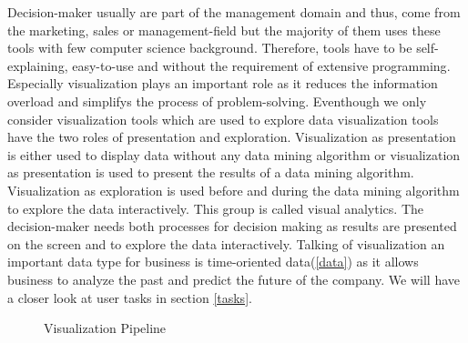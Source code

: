 Decision-maker usually are part of the management domain and thus, come from the marketing, sales or management-field but the majority of them uses these tools with few computer science background. Therefore, tools have to be self-explaining, easy-to-use \cite{Crapo2000} and without the requirement of extensive programming\label{user}. Especially visualization plays an important role as it reduces the information overload\cite{Keima} and simplifys the process of problem-solving\cite{Zhang}. Eventhough we only consider visualization tools which are used to explore data visualization tools have the two roles of presentation and exploration\cite{Crapo2000}. Visualization as presentation is either used to display data without any data mining algorithm or visualization as presentation is used to present the results of a data mining algorithm. Visualization as exploration is used before and during the data mining algorithm to explore the data interactively. This group is called visual analytics. The decision-maker needs both processes for decision making as results are presented on the screen and to explore the data interactively\cite{Ware2012a}. 
Talking of visualization an important data type for business is time-oriented data(\ref{data}) as it allows business to analyze the past and predict the future of the company\cite{Ao2010}. We will have a closer look at user tasks in section \ref{tasks}.
 
\begin{figure}[H]
    \centering
    \caption{Visualization Pipeline \cite{Ware2012a}}
    \label{fig:my_label}
\end{figure}


